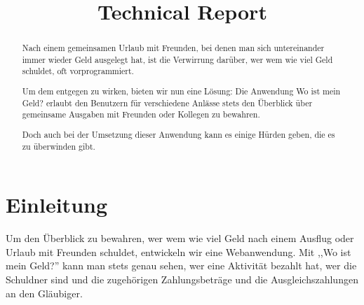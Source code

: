 \documentclass[conference]{IEEEtran}
\begin{document}
\title{Technical Report}

\author{
    \and
    \and
    \and
    \and
    \and
    \and
}

\maketitle

\begin{abstract}
    Nach einem gemeinsamen Urlaub mit Freunden, bei denen man sich untereinander
    immer wieder Geld ausgelegt hat, ist die Verwirrung darüber,
    wer wem wie viel Geld schuldet, oft vorprogrammiert.

    Um dem entgegen zu wirken, bieten wir nun eine Lösung: Die Anwendung
    \glqq Wo ist mein Geld?\grqq{} erlaubt den Benutzern für verschiedene Anlässe stets
    den Überblick über gemeinsame Ausgaben mit Freunden oder Kollegen zu
    bewahren.

    Doch auch bei der Umsetzung dieser Anwendung kann es einige Hürden geben, die es zu überwinden gibt.
\end{abstract}


\section{Einleitung}
Um den Überblick zu bewahren, wer wem wie viel Geld nach einem Ausflug oder Urlaub mit Freunden schuldet,
entwickeln wir eine Webanwendung. Mit ,,Wo ist mein Geld?'' kann man stets genau sehen, wer eine Aktivität bezahlt hat,
wer die Schuldner sind und die zugehörigen Zahlungsbeträge und die Ausgleichszahlungen an den \gls{Gläubiger}.
\end{document}
